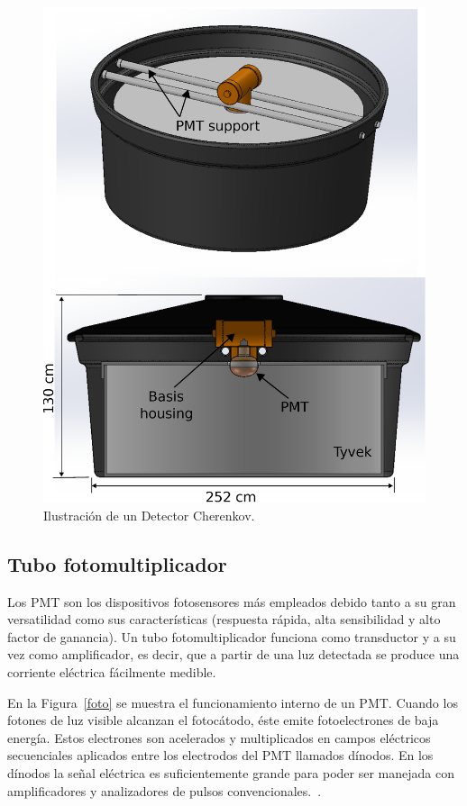 \begin{figure}[H]
\includegraphics[scale=0.4]{Figs/Tank.eps} 
\centering
\caption{Ilustración de un Detector Cherenkov.~\citep{hernandez2018procedimiento}}
\label{tank}
\end{figure}

\subsection{Tubo fotomultiplicador}
Los PMT son los dispositivos fotosensores más empleados debido tanto a su gran versatilidad como sus características (respuesta rápida, alta sensibilidad y alto factor de ganancia).
Un tubo fotomultiplicador funciona como transductor y a su vez como amplificador, es decir, que a partir de una luz detectada se produce una corriente eléctrica fácilmente medible.

En la Figura~\ref{foto} se muestra el funcionamiento interno de un PMT.
Cuando los fotones de luz visible alcanzan el fotocátodo, éste emite fotoelectrones de baja energía.
Estos electrones son acelerados y multiplicados en campos eléctricos secuenciales aplicados entre los electrodos del PMT llamados dínodos.
En los dínodos la señal eléctrica es suficientemente grande para poder ser manejada con amplificadores y analizadores de pulsos convencionales.~\citep{kaptanoglu2018characterization}.


